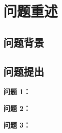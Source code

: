 \section{问题重述}

\subsection{问题背景}

\subsection{问题提出}

\textbf{问题 1：}

\textbf{问题 2：}

\textbf{问题 3：}


